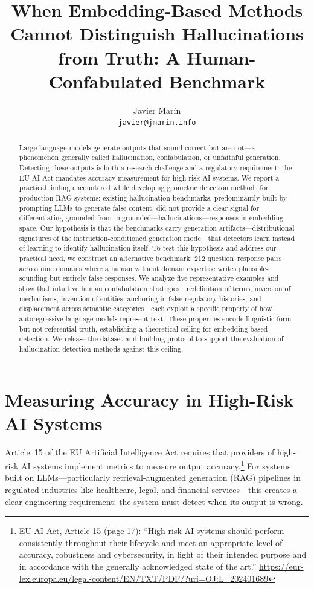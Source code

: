 \documentclass[11pt]{article}
\title{When Embedding-Based Methods Cannot Distinguish Hallucinations from Truth: A Human-Confabulated Benchmark}
\author{Javier Mar\'{i}n \\
\texttt{javier@jmarin.info}}
\date{}
\begin{document}
\maketitle

\begin{abstract}
Large language models generate outputs that sound correct but are not---a phenomenon generally called hallucination, confabulation, or unfaithful generation.
Detecting these outputs is both a research challenge and a regulatory requirement: the EU AI Act mandates accuracy measurement for high-risk AI systems.
We report a practical finding encountered while developing geometric detection methods for production RAG systems: existing hallucination benchmarks, predominantly built by prompting LLMs to generate false content, did not provide a clear signal for differentiating grounded from ungrounded—hallucinations—responses in embedding space.
Our hypothesis is that the benchmarks carry generation artifacts---distributional signatures of the instruction-conditioned generation mode---that detectors learn instead of learning to identify hallucination itself.
To test this hypothesis and address our practical need, we construct an alternative benchmark: 212 question--response pairs across nine domains where a human without domain expertise writes plausible-sounding but entirely false responses.
We analyze five representative examples and show that intuitive human confabulation strategies---redefinition of terms, inversion of mechanisms, invention of entities, anchoring in false regulatory histories, and displacement across semantic categories---each exploit a specific property of how autoregressive language models represent text.
These properties encode linguistic form but not referential truth, establishing a theoretical ceiling for embedding-based detection.
We release the dataset and building protocol to support the evaluation of hallucination detection methods against this ceiling.
\end{abstract}

\section{Measuring Accuracy in High-Risk AI Systems}
\label{sec:problem}

Article~15 of the EU Artificial Intelligence Act \citep{euaiact2024} requires that providers of high-risk AI systems implement metrics to measure output accuracy.\footnote{EU AI Act, Article 15 (page 17): ``High-risk AI systems should perform consistently throughout their lifecycle and meet an appropriate level of
accuracy, robustness and cybersecurity, in light of their intended purpose and in accordance with the generally acknowledged state of the art.'' \url{https://eur-lex.europa.eu/legal-content/EN/TXT/PDF/?uri=OJ:L_202401689}}
For systems built on LLMs---particularly retrieval-augmented generation (RAG) pipelines in regulated industries like healthcare, legal, and financial services---this creates a clear engineering requirement: the system must detect when its output is wrong.
\end{document}
